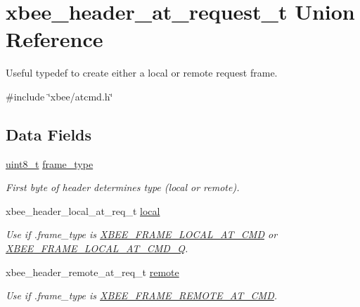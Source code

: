 \hypertarget{unionxbee__header__at__request__t}{\section{xbee\-\_\-header\-\_\-at\-\_\-request\-\_\-t Union Reference}
\label{unionxbee__header__at__request__t}
}


Useful typedef to create either a local or remote request frame.  




{\ttfamily \#include \char`\"{}xbee/atcmd.\-h\char`\"{}}

\subsection*{Data Fields}
\begin{DoxyCompactItemize}
\item 
\hypertarget{unionxbee__header__at__request__t_afa34d393db5fa915716b483011415ddc}{\hyperlink{group__hal_gae1affc9ca37cfb624959c866a73f83c2}{uint8\-\_\-t} \hyperlink{unionxbee__header__at__request__t_afa34d393db5fa915716b483011415ddc}{frame\-\_\-type}}\label{unionxbee__header__at__request__t_afa34d393db5fa915716b483011415ddc}

\begin{DoxyCompactList}\small\item\em First byte of header determines type (local or remote). \end{DoxyCompactList}\item 
xbee\-\_\-header\-\_\-local\-\_\-at\-\_\-req\-\_\-t \hyperlink{unionxbee__header__at__request__t_aae9b1a9bf279fa1932c6222e3d4b5da2}{local}
\begin{DoxyCompactList}\small\item\em Use if .frame\-\_\-type is \hyperlink{group__xbee__device_gga7753bbebaf00d6d64942f64b6ae9b7b9a540fdafbf3dbb8b5d07be5888e3573ee}{X\-B\-E\-E\-\_\-\-F\-R\-A\-M\-E\-\_\-\-L\-O\-C\-A\-L\-\_\-\-A\-T\-\_\-\-C\-M\-D} or \hyperlink{group__xbee__device_gga7753bbebaf00d6d64942f64b6ae9b7b9a4dccc9c3f9859247218c0d0a93e2582a}{X\-B\-E\-E\-\_\-\-F\-R\-A\-M\-E\-\_\-\-L\-O\-C\-A\-L\-\_\-\-A\-T\-\_\-\-C\-M\-D\-\_\-\-Q}. \end{DoxyCompactList}\item 
\hypertarget{unionxbee__header__at__request__t_afaac4d50b8627529565a1d55950c44f6}{xbee\-\_\-header\-\_\-remote\-\_\-at\-\_\-req\-\_\-t \hyperlink{unionxbee__header__at__request__t_afaac4d50b8627529565a1d55950c44f6}{remote}}\label{unionxbee__header__at__request__t_afaac4d50b8627529565a1d55950c44f6}

\begin{DoxyCompactList}\small\item\em Use if .frame\-\_\-type is \hyperlink{group__xbee__device_gga7753bbebaf00d6d64942f64b6ae9b7b9a44cc0afd79605edfc1f4d5cbb7ed62a2}{X\-B\-E\-E\-\_\-\-F\-R\-A\-M\-E\-\_\-\-R\-E\-M\-O\-T\-E\-\_\-\-A\-T\-\_\-\-C\-M\-D}. \end{DoxyCompactList}\end{DoxyCompactItemize}



